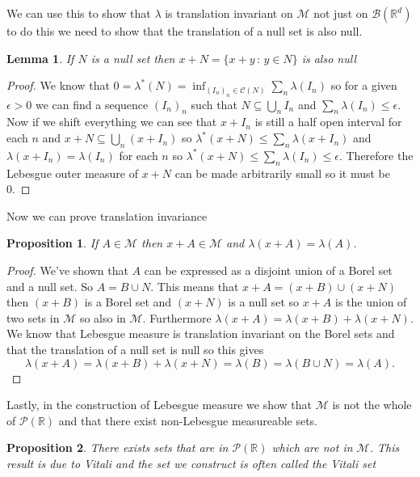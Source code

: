 \documentclass[
]{book}
\newtheorem{lemma}{Lemma}[chapter]
\newtheorem{proposition}{Proposition}[chapter]
\theoremstyle{definition}
\theoremstyle{definition}
\theoremstyle{definition}
\theoremstyle{definition}
\theoremstyle{remark}
\begin{document}
We can use this to show that \(\lambda\) is translation invariant on \(\mathscr{M}\) not just on \(\mathcal{B}(\mathbb{R}^d)\) to do this we need to show that the translation of a null set is also null.

\begin{lemma}
If \(N\) is a null set then \(x+N = \{ x+y \,:\, y \in N\}\) is also null
\end{lemma}

\begin{proof}
We know that \(0 = \lambda^*(N) = \inf_{(I_n)_n \in \mathcal{C}(N)}\sum_n \lambda(I_n)\) so for a given \(\epsilon > 0\) we can find a sequence \((I_n)_n\) such that \(N \subseteq \bigcup_n I_n\) and \(\sum_n \lambda(I_n) \leq \epsilon\). Now if we shift everything we can see that \(x+ I_n\) is still a half open interval for each \(n\) and \(x+N \subseteq \bigcup_n (x+I_n)\) so \(\lambda^*(x+N) \leq \sum_n \lambda(x+I_n)\) and \(\lambda(x+ I_n) = \lambda(I_n)\) for each \(n\) so \(\lambda^*(x+N) \leq \sum_n \lambda (I_n) \leq \epsilon\). Therefore the Lebesgue outer measure of \(x+N\) can be made arbitrarily small so it must be 0.
\end{proof}

Now we can prove translation invariance

\begin{proposition}
If \(A \in \mathscr{M}\) then \(x+A \in \mathscr{M}\) and \(\lambda(x+A)=\lambda(A)\).
\end{proposition}

\begin{proof}
We've shown that \(A\) can be expressed as a disjoint union of a Borel set and a null set. So \(A = B \cup N\). This means that \(x+A = (x+B) \cup (x+N)\) then \((x+B)\) is a Borel set and \((x+N)\) is a null set so \(x+A\) is the union of two sets in \(\mathscr{M}\) so also in \(\mathscr{M}\). Furthermore \(\lambda(x+A) = \lambda(x+B) + \lambda(x+N)\). We know that Lebesgue measure is translation invariant on the Borel sets and that the translation of a null set is null so this gives
\[ \lambda(x+A) = \lambda(x+B)+\lambda(x+N)= \lambda(B) = \lambda(B\cup N)= \lambda(A).  \]
\end{proof}

Lastly, in the construction of Lebesgue measure we show that \(\mathscr{M}\) is not the whole of \(\mathscr{P}(\mathbb{R})\) and that there exist non-Lebesgue measureable sets.

\begin{proposition}
There exists sets that are in \(\mathscr{P}(\mathbb{R})\) which are not in \(\mathscr{M}\). This result is due to Vitali and the set we construct is often called the \emph{Vitali set}
\end{proposition}
\end{document}
